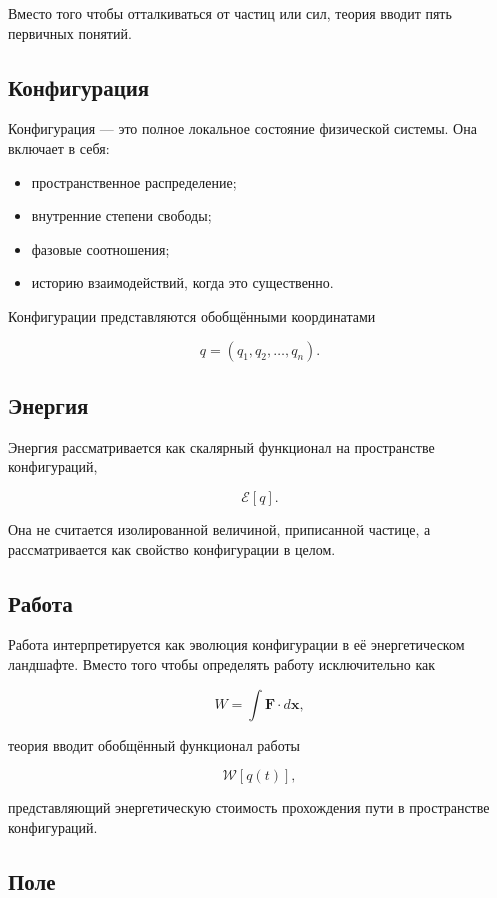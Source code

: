 Вместо того чтобы отталкиваться от частиц или сил, теория вводит пять первичных понятий.

\subsection{Конфигурация}

Конфигурация — это полное локальное состояние физической системы. Она включает в себя:

\begin{itemize}
\item пространственное распределение;
\item внутренние степени свободы;
\item фазовые соотношения;
\item историю взаимодействий, когда это существенно.
\end{itemize}

Конфигурации представляются обобщёнными координатами

\[ q=(q_1,q_2,\ldots,q_n). \]

\subsection{Энергия}

Энергия рассматривается как скалярный функционал на пространстве конфигураций,

\[ \mathcal E[q]. \]

Она не считается изолированной величиной, приписанной частице, а рассматривается как свойство конфигурации в целом.

\subsection{Работа}

Работа интерпретируется как эволюция конфигурации в её энергетическом ландшафте. Вместо того чтобы определять работу исключительно как

\[ W=\int \mathbf F\cdot d\mathbf x, \]

теория вводит обобщённый функционал работы

\[ \mathcal W[q(t)] , \]

представляющий энергетическую стоимость прохождения пути в пространстве конфигураций.

\subsection{Поле}

